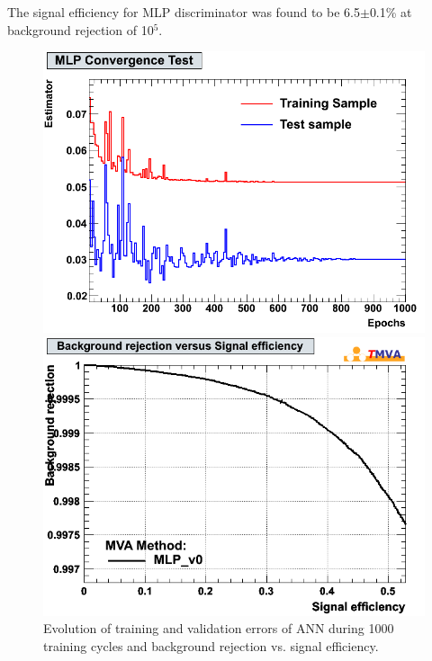 \documentclass[a4paper]{jpconf}
\begin{document}
The signal efficiency for MLP discriminator was found to be  6.5$\pm$0.1\% at background rejection of 10$^5$.
\begin{figure}[h]
 \begin{minipage}{8.1cm}
\includegraphics[width=1.0\textwidth]{images/MLPConvergenceTest.png}
\end{minipage}
 \hfill
\begin{minipage}{8.1cm}

\includegraphics[width=1.0\textwidth]{images/roc.png}
\end{minipage}
\caption{Evolution of training and validation errors of ANN during 1000 training cycles and 
background rejection vs. signal efficiency.}
\label{fig:nn}
\end{figure}
\end{document}
